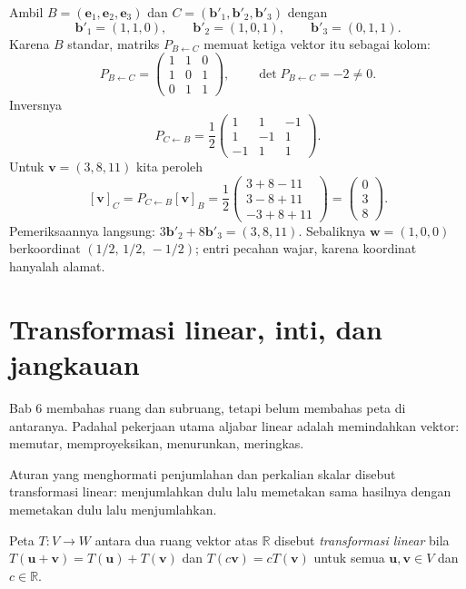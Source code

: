 Ambil $B=(\mathbf{e}_{1},\mathbf{e}_{2},\mathbf{e}_{3})$
dan $C=(\mathbf{b}'_{1},\mathbf{b}'_{2},\mathbf{b}'_{3})$ dengan
\[
  \mathbf{b}'_{1}=(1,1,0),\qquad \mathbf{b}'_{2}=(1,0,1),\qquad \mathbf{b}'_{3}=(0,1,1).
\]
Karena $B$ standar, matriks $P_{B\leftarrow C}$ memuat ketiga vektor itu sebagai kolom:
\[
  P_{B\leftarrow C}=\begin{pmatrix}1&1&0\\ 1&0&1\\ 0&1&1\end{pmatrix},
  \qquad \det P_{B\leftarrow C}=-2\neq0 .
\]
Inversnya
\[
  P_{C\leftarrow B}=\frac{1}{2}\begin{pmatrix}1&1&-1\\ 1&-1&1\\ -1&1&1\end{pmatrix}.
\]
Untuk $\mathbf{v}=(3,8,11)$ kita peroleh
\[
  [\mathbf{v}]_{C}=P_{C\leftarrow B}[\mathbf{v}]_{B}
  =\frac{1}{2}\begin{pmatrix}3+8-11\\ 3-8+11\\ -3+8+11\end{pmatrix}
  =\begin{pmatrix}0\\ 3\\ 8\end{pmatrix}.
\]
Pemeriksaannya langsung: $3\mathbf{b}'_{2}+8\mathbf{b}'_{3}=(3,8,11)$. Sebaliknya
$\mathbf{w}=(1,0,0)$ berkoordinat $(1/2,\,1/2,\,-1/2)$; entri pecahan wajar, karena
koordinat
hanyalah alamat.

\section{Transformasi linear, inti, dan jangkauan}

Bab 6 membahas ruang dan subruang, tetapi belum membahas peta di antaranya. Padahal
pekerjaan utama aljabar linear adalah memindahkan vektor: memutar, memproyeksikan,
menurunkan, meringkas.

Aturan yang menghormati penjumlahan dan perkalian skalar disebut transformasi linear:
menjumlahkan dulu lalu memetakan sama hasilnya dengan memetakan dulu lalu menjumlahkan.

\begin{definisi}
Peta $T\colon V\to W$ antara dua ruang vektor atas $\mathbb{R}$ disebut
\emph{transformasi linear} bila $T(\mathbf{u}+\mathbf{v})=T(\mathbf{u})+T(\mathbf{v})$ dan
$T(c\mathbf{v})=cT(\mathbf{v})$ untuk semua $\mathbf{u},\mathbf{v}\in V$ dan $c\in\mathbb{R}$.
\end{definisi}


